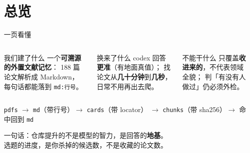 

\section{总览}

\begin{frame}{一页看懂}
  \vspace{-3.2em}
  \begin{columns}[T]
    \begin{block}{我们建了什么}
      \small
      一个\textbf{可溯源的外置文献记忆}：
      188 篇论文解析成 Markdown，
      每句话都能落到 \texttt{md:行号}。
    \end{block}

    \begin{block}{换来了什么}
      \small
      codex 回答\textbf{更准}（有地面真值）；
      找论文从\textbf{几十分钟}到\textbf{几秒}，
      日常不用再出去爬。
    \end{block}

    \begin{block}{不能干什么}
      \small
      只覆盖\textbf{收进来的}，不代表领域全貌；
      判「有没有人做过」\alert{仍必须外检}。
    \end{block}
  \end{columns}

  \vspace{0.5em}
  \begin{center}
    \footnotesize
    \texttt{pdfs} $\to$ \texttt{md}（带行号）$\to$ \texttt{cards}（带 locator）
    $\to$ \texttt{chunks}（带 sha256）$\to$ 命中回到 \texttt{md}
  \end{center}

  \vspace{0.3em}
  \begin{center}
    \small 一句话：仓库提升的不是模型的智力，是回答的\textbf{地基}。\\
    \vspace{0.2em}
    \scriptsize 选题的进度，是你杀掉的候选数，不是收藏的论文数。
  \end{center}
\end{frame}

